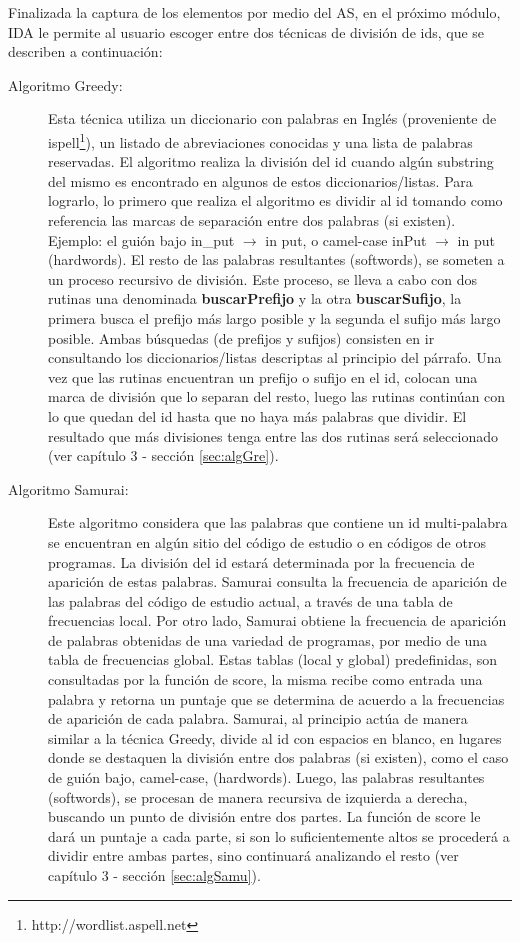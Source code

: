 Finalizada la captura de los elementos por medio del AS, en el próximo módulo, IDA le permite al usuario escoger entre dos técnicas de división de ids, que se describen a continuación:

\begin{description}

\item[Algoritmo Greedy:] Esta técnica utiliza un diccionario con palabras en Inglés (proveniente de ispell\footnote[1]{ http://wordlist.aspell.net}), un listado de abreviaciones conocidas y una lista de palabras reservadas. El algoritmo realiza la división del id cuando algún substring del mismo es encontrado en algunos de estos diccionarios/listas.
Para lograrlo, lo primero que realiza el algoritmo es dividir al id tomando como referencia las marcas de separación entre dos palabras (si existen). Ejemplo: el guión bajo \textsf{in\_put} $\rightarrow$ \textsf{in put}, o camel-case \textsf{inPut} $\rightarrow$ \textsf{in put} (hardwords). El resto de las palabras resultantes (softwords), se someten a un proceso recursivo de división.
Este proceso, se lleva a cabo con dos rutinas una denominada \textbf{buscarPrefijo} y la otra \textbf{buscarSufijo}, la primera busca el prefijo más largo posible y la segunda el sufijo más largo posible. Ambas búsquedas (de prefijos y sufijos) consisten en ir consultando los diccionarios/listas descriptas al principio del párrafo. Una vez que las rutinas encuentran un prefijo o sufijo en el id, colocan una marca de división que lo separan del resto, luego las rutinas continúan con lo que quedan del id hasta que no haya más palabras que dividir. El resultado que más divisiones tenga entre las dos rutinas será seleccionado (ver capítulo 3 - sección \ref{sec:algGre}).

\item[Algoritmo Samurai:] Este algoritmo considera que las palabras que contiene un id multi-palabra se encuentran en algún sitio del código de estudio o en códigos de otros programas. La división del id estará determinada por la frecuencia de aparición de estas palabras. 
Samurai consulta la frecuencia de aparición de las palabras del código de estudio actual, a través de una tabla de frecuencias local. Por otro lado, Samurai obtiene la frecuencia de aparición de palabras obtenidas de una variedad de programas, por medio de una tabla de frecuencias global.
Estas tablas (local y global) predefinidas, son consultadas por la función de score, la misma recibe como entrada una palabra y retorna un puntaje que se determina de acuerdo a la frecuencias de aparición de cada palabra.
Samurai, al principio actúa de manera similar a la técnica Greedy, divide al id con espacios en blanco, en lugares donde se destaquen la división entre dos palabras (si existen), como el caso de guión bajo, camel-case, (hardwords).
Luego, las palabras resultantes (softwords), se procesan de manera recursiva de izquierda a derecha, buscando un punto de división entre dos partes. La función de score le dará un puntaje a cada parte, si son lo suficientemente altos se procederá a dividir entre ambas partes, sino continuará analizando el resto (ver capítulo 3 - sección \ref{sec:algSamu}).

\end{description}

